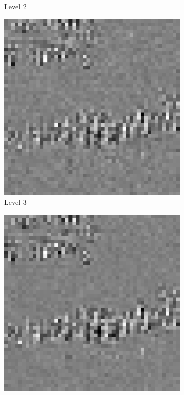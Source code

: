 \begin{figure}[t]
\begin{subfigure}{0.2\textwidth}
\caption{Level 2}
\end{subfigure}%
\begin{subfigure}{0.2\textwidth}
\includegraphics[width=\textwidth]{img/aliasedImgDifL3}
\caption{Level 3}
\end{subfigure}%
\begin{subfigure}{0.2\textwidth}
\includegraphics[width=\textwidth]{img/aliasedImgDifL4}

\end{subfigure}
\end{figure}

